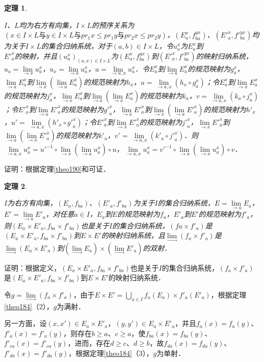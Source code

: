 \documentclass[12pt, a4paper, oneside]{book}
\newtheorem{theo}{定理}
\begin{document}
			\begin{theo}\label{theo191}
				\hfill\par
				$I$、$L$均为右方有向集，$I\times L$的预序关系为$(x\in I\times L\text{与}y\in I\times L\text{与}pr_1x\leq pr_1y\text{与}pr_2x\leq pr_2y)$，$(E_a^x, f_{ba}^{yx})$、$({E'}_a^x, {f'}_{ba}^{yx})$均为关于$I\times L$的集合归纳系统，对于$(a, b)\in I\times L$，令$u_a^x$为$E_a^x$到\\${E'}_a^x$的映射，并且$(u_a^x)_{(a, x)\in I\times L}$为$(E_a^x, f_{ba}^{yx})$到$({E'}_a^x, {f'}_{ba}^{yx})$的映射归纳系统，$u_a=\lim\limits_{\to x}u_a^x$，$u_x=\lim\limits_{\to a}u_a^x$，$u=\lim\limits_{\to a, x}u_a^x$．令$E_a^x$到$\lim\limits_{\to a}E_a^x$的规范映射为$g_a^x$，$\lim\limits_{\to a}E_a^x$到$\lim\limits_{\to x}(\lim\limits_{\to a}E_a^x)$的规范映射为$h_x$，$u=\lim\limits_{\to a, x}(h_x\circ g_a^x)$；令$E_a^x$到$\lim\limits_{\to x}E_a^x$的规范映射为$j_a^x$，$\lim\limits_{\to x}E_a^x$到$\lim\limits_{\to a}(\lim\limits_{\to x}E_a^x)$的规范映射为$k_a$，$v=\lim\limits_{\to a, x}(k_a\circ j_a^x)$；令${E'}_a^x$到$\lim\limits_{\to a}{E'}_a^x$的规范映射为${g'}_a^x$，$\lim\limits_{\to a}{E'}_a^x$到$\lim\limits_{\to x}(\lim\limits_{\to a}{E'}_a^x)$的规范映射为${h'}_x$，$u'=\lim\limits_{\to a, x}({h'}_x\circ {g'}_a^x)$；令${E'}_a^x$到$\lim\limits_{\to x}{E'}_a^x$的规范映射为${j'}_a^x$，$\lim\limits_{\to x}{E'}_a^x$到$\lim\limits_{\to a}(\lim\limits_{\to x}{E'}_a^x)$的规范映射为${k'}_a$，$v'=\lim\limits_{\to a, x}({k'}_a\circ {j'}_a^x)$．则$\lim\limits_{\to a, x}u_a^x={u'}^{-1}\circ \lim\limits_{\to x}(\lim\limits_{\to a}u_a^x)\circ u$，$\lim\limits_{\to a, x}u_a^x={v'}^{-1}\circ \lim\limits_{\to a}(\lim\limits_{\to x}u_a^x)\circ v$．
			\end{theo}
			证明：根据定理\ref{theo190}和可证．
					
			\begin{theo}\label{theo192}
				\hfill\par
				$I$为右方有向集，$(E_a, f_{ba})$、$({E'}_a, {f'}_{ba})$为关于$I$的集合归纳系统，$E=\lim\limits_{\to a}E_a$，$E'=\lim\limits_{\to a}{E'}_a$，对任意$a\in I$，$E_a$到$E$的规范映射为$f_a$，${E'}_a$到$E'$的规范映射为${f'}_a$，则$(E_a\times {E'}_a, f_{ba}\times {f'}_{ba})$也是关于$I$的集合归纳系统，$(fa\times {f'}_a)$是$(E_a\times {E'}_a, f_{ba}\times {f'}_{ba})$到$E\times E'$的映射归纳系统，且$\lim\limits_{\to} (f_a\times {f'}_a)$是$\lim\limits_{\to} (E_a\times {E'}_a)$到$(\lim\limits_\to E_a)\times (\lim\limits_\to {E'}_a)$的双射．
			\end{theo}
			证明：根据定义，$(E_a\times {E'}_a, f_{ba}\times {f'}_{ba})$也是关于$I$的集合归纳系统，$(f_a\times {f'}_a)$是$(E_a\times {E'}_a, f_{ba}\times {f'}_{ba})$到$E\times E'$的映射归纳系统．
			\par
			令$g=\lim\limits_\to (f_a\times {f'}_a)$，由于$E\times E'=\bigcup\limits_{a\in I}f_a(E_a)\times {f'}_a({E'}_a)$，根据定理\ref{theo184}（2），$g$为满射．
			\par
			另一方面，设$(x, x')\in E_a\times {E'}_a$，$(y, y')\in E_a\times {E'}_a$，并且$f_a(x)=f_a(y)$、${f'}_a(x)={f'}_a(y)$，则存在$b\geq a$、$c\geq a$，使$f_{ba}(x)=f_{ba}(y)$、${f'}_{ca}(x)={f'}_{ca}(y)$，进而，存在$d\geq c$、$d\geq b$，故$f_{da}(x)=f_{da}(y)$、${f'}_{da}(x)={f'}_{da}(y)$，根据定理\ref{theo184}（3），$g$为单射．
			
\end{document}
